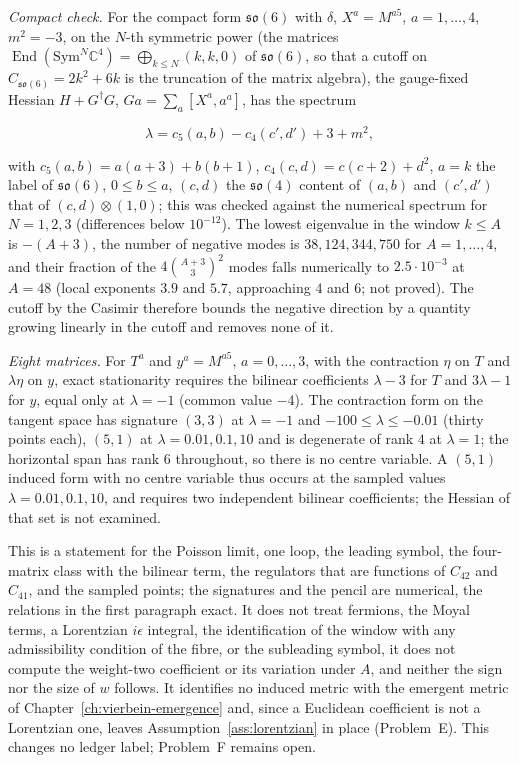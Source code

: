 \emph{Compact check.} For the compact form \(\mathfrak{so}(6)\) with \(\delta\), \(X^a=M^{a5}\), \(a=1,\dots,4\), \(m^2=-3\), on the \(N\)-th symmetric power (the matrices \(\operatorname{End}(\mathrm{Sym}^N\mathbb C^4)=\bigoplus_{k\le N}(k,k,0)\) of \(\mathfrak{so}(6)\), so that a cutoff on \(C_{\mathfrak{so}(6)}=2k^2+6k\) is the truncation of the matrix algebra), the gauge-fixed Hessian \(H+G^\dagger G\), \(Ga=\sum_a[X^a,a^a]\), has the spectrum

\[

\lambda=c_5(a,b)-c_4(c',d')+3+m^2,

\]

with \(c_5(a,b)=a(a+3)+b(b+1)\), \(c_4(c,d)=c(c+2)+d^2\), \(a=k\) the label of \(\mathfrak{so}(6)\), \(0\le b\le a\), \((c,d)\) the \(\mathfrak{so}(4)\) content of \((a,b)\) and \((c',d')\) that of \((c,d)\otimes(1,0)\); this was checked against the numerical spectrum for \(N=1,2,3\) (differences below \(10^{-12}\)). The lowest eigenvalue in the window \(k\le A\) is \(-(A+3)\), the number of negative modes is \(38,124,344,750\) for \(A=1,\dots,4\), and their fraction of the \(4\binom{A+3}{3}^2\) modes falls numerically to \(2.5\cdot10^{-3}\) at \(A=48\) (local exponents \(3.9\) and \(5.7\), approaching \(4\) and \(6\); not proved). The cutoff by the Casimir therefore bounds the negative direction by a quantity growing linearly in the cutoff and removes none of it.



\emph{Eight matrices.} For \(T^a\) and \(y^a=M^{a5}\), \(a=0,\dots,3\), with the contraction \(\eta\) on \(T\) and \(\lambda\eta\) on \(y\), exact stationarity requires the bilinear coefficients \(\lambda-3\) for \(T\) and \(3\lambda-1\) for \(y\), equal only at \(\lambda=-1\) (common value \(-4\)). The contraction form on the tangent space has signature \((3,3)\) at \(\lambda=-1\) and \(-100\le\lambda\le-0.01\) (thirty points each), \((5,1)\) at \(\lambda=0.01,0.1,10\) and is degenerate of rank \(4\) at \(\lambda=1\); the horizontal span has rank \(6\) throughout, so there is no centre variable. A \((5,1)\) induced form with no centre variable thus occurs at the sampled values \(\lambda=0.01,0.1,10\), and requires two independent bilinear coefficients; the Hessian of that set is not examined.



This is a statement for the Poisson limit, one loop, the leading symbol, the four-matrix class with the bilinear term, the regulators that are functions of \(C_{42}\) and \(C_{41}\), and the sampled points; the signatures and the pencil are numerical, the relations in the first paragraph exact. It does not treat fermions, the Moyal terms, a Lorentzian \(i\epsilon\) integral, the identification of the window with any admissibility condition of the fibre, or the subleading symbol, it does not compute the weight-two coefficient or its variation under \(A\), and neither the sign nor the size of \(w\) follows. It identifies no induced metric with the emergent metric of Chapter~\ref{ch:vierbein-emergence} and, since a Euclidean coefficient is not a Lorentzian one, leaves Assumption~\ref{ass:lorentzian} in place (Problem~E). This changes no ledger label; Problem~F remains open.



